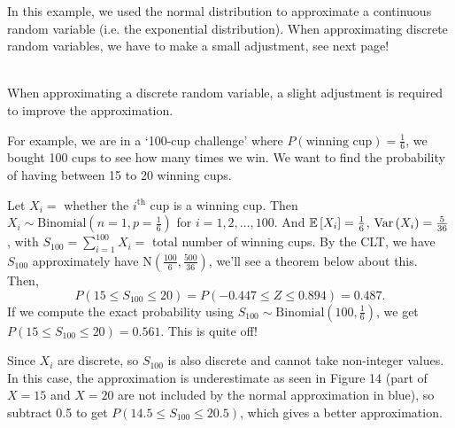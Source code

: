 \begin{note}
    In this example, we used the normal distribution to approximate a continuous random variable (i.e. the exponential distribution). When approximating discrete random variables, we have to make a small adjustment, see next page!
\end{note}


\pagebreak


\begin{remark}
    \phantom{}\\
    When approximating a discrete random variable, a slight adjustment is required to improve the approximation. 

For example, we are in a `100-cup challenge' where $P(\text{winning cup}) = \frac{1}{6}$, we bought 100 cups to see how many times we win. We want to find the probability of having between 15 to 20 winning cups. 

Let $X_i = $ whether the $i^{\text{th}}$ cup is a winning cup. Then $X_i \sim \text{Binomial}(n=1,p=\frac{1}{6})$ for $i = 1,2,\ldots,100$. And $\mathbb{E}\left[{X_i}\right] = \frac{1}{6}$, $\operatorname{Var}\left({X_i}\right) = \frac{5}{36}$, with $S_{100} = \displaystyle \sum_{i=1}^{100} X_i = $ total number of winning cups. By the CLT, we have $S_{100}$ approximately have $\text{N}(\frac{100}{6}, \frac{500}{36})$, we'll see a theorem below about this. Then,
\[
    P(15 \leq S_{100} \leq 20) = P(-0.447 \leq Z \leq 0.894) = 0.487.
\]
If we compute the exact probability using $S_{100} \sim \text{Binomial}(100, \frac{1}{6})$, we get $P(15 \leq S_{100} \leq 20) = 0.561$. This is quite off!

Since $X_i$ are discrete, so $S_{100}$ is also discrete and cannot take non-integer values. In this case, the approximation is underestimate as seen in Figure 14 (part of $X=15$ and $X = 20$ are not included by the normal approximation in {\color{blue} blue}), so subtract 0.5 to get $P(14.5 \leq S_{100} \leq 20.5)$, which gives a better approximation.


\end{remark}
